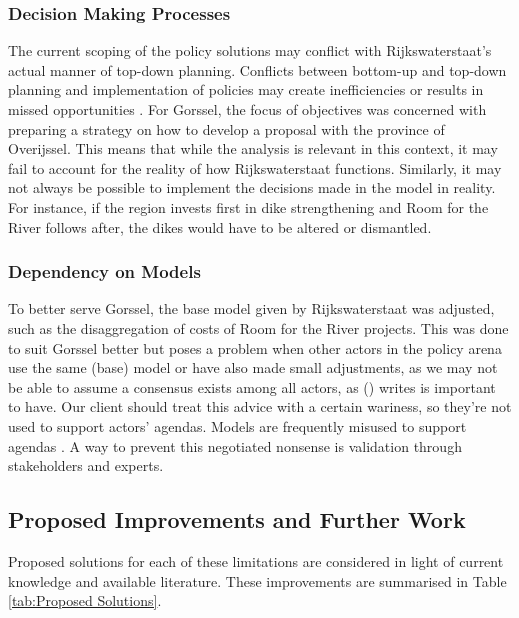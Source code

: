 \subsubsection{Decision Making Processes}
The current scoping of the policy solutions may conflict with Rijkswaterstaat's actual manner of top-down planning. Conflicts between bottom-up and top-down planning and implementation of policies may create inefficiencies or results in missed opportunities \parencite{koontz_planning_2014}. For Gorssel, the focus of objectives was concerned with preparing a strategy on how to develop a proposal with the province of Overijssel. This means that while the analysis is relevant in this context, it may fail to account for the reality of how Rijkswaterstaat functions. Similarly, it may not always be possible to implement the decisions made in the model in reality. For instance, if the region invests first in dike strengthening and Room for the River follows after, the dikes would have to be altered or dismantled. 

\subsubsection{Dependency on Models}
To better serve Gorssel, the base model given by Rijkswaterstaat was adjusted, such as the disaggregation of costs of Room for the River projects. This was done to suit Gorssel better but poses a problem when other actors in the policy arena use the same (base) model or have also made small adjustments, as we may not be able to assume a consensus exists among all actors, as \citeauthor{kwakkel_coping_2016} (\citeyear{kwakkel_coping_2016}) writes is important to have. Our client should treat this advice with a certain wariness, so they're not used to support actors' agendas. Models are frequently misused to support agendas \parencite{saltelli_five_2020}. A way to prevent this negotiated nonsense is validation through stakeholders and experts. 

\subsection{Proposed Improvements and Further Work}
Proposed solutions for each of these limitations are considered in light of current knowledge and available literature. These improvements are summarised in Table \ref{tab:Proposed Solutions}.

